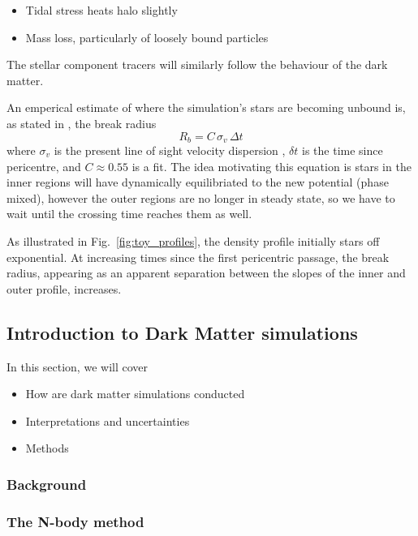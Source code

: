 \begin{itemize}
\tightlist
\item
  Tidal stress heats halo slightly
\item
  Mass loss, particularly of loosely bound particles
\end{itemize}

The stellar component tracers will similarly follow the behaviour of the
dark matter.

An emperical estimate of where the simulation's stars are becoming
unbound is, as stated in \citet{PNM2008}, the break radius
\begin{equation}{
R_b = C\,\sigma_{v}\,\Delta t
}\end{equation} where \(\sigma_v\) is the present line of sight velocity
dispersion , \(\delta t\) is the time since pericentre, and
\(C \approx 0.55\) is a fit. The idea motivating this equation is stars
in the inner regions will have dynamically equilibriated to the new
potential (phase mixed), however the outer regions are no longer in
steady state, so we have to wait until the crossing time reaches them as
well.

As illustrated in Fig.~\ref{fig:toy_profiles}, the density profile
initially stars off exponential. At increasing times since the first
pericentric passage, the break radius, appearing as an apparent
separation between the slopes of the inner and outer profile, increases.

\subsection{Introduction to Dark Matter
simulations}\label{introduction-to-dark-matter-simulations}

In this section, we will cover

\begin{itemize}
\tightlist
\item
  How are dark matter simulations conducted
\item
  Interpretations and uncertainties
\item
  Methods
\end{itemize}

\subsubsection{Background}\label{background}

\subsubsection{The N-body method}\label{the-n-body-method}

